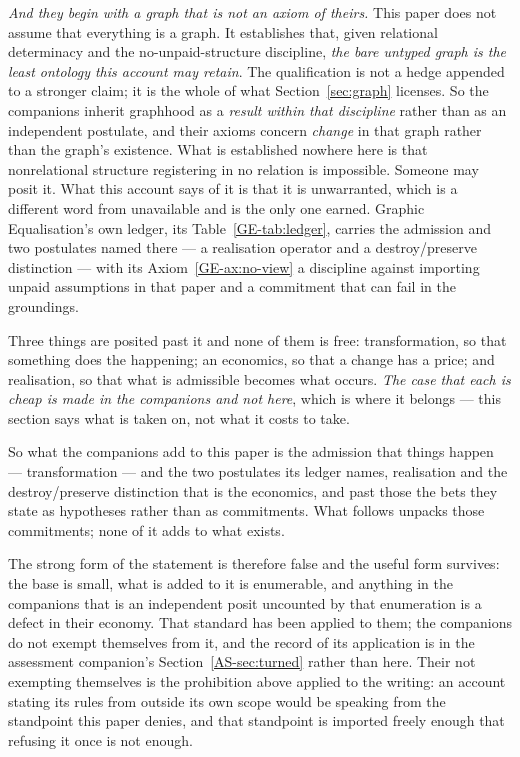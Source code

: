 \documentclass[11pt,a4paper]{article}
\begin{document}
\emph{And they begin with a graph that is not an axiom of theirs.} This paper does not assume that
everything is a graph. It establishes that, given relational determinacy and the
no-unpaid-structure discipline, \emph{the bare untyped graph is the least ontology this account may
retain}. The qualification is not a hedge appended to a stronger claim; it is the whole of what
Section~\ref{sec:graph} licenses. So the companions inherit graphhood as a \emph{result within that
discipline} rather than as an independent postulate, and their axioms concern \emph{change} in that
graph rather than the graph's existence. What is established nowhere here is that nonrelational
structure registering in no relation is impossible. Someone may posit it. What this account says of it
is that it is unwarranted, which is a different word from unavailable and is the only one earned.
Graphic Equalisation's own ledger, its Table~\ref{GE-tab:ledger}, carries the admission and two
postulates named there --- a realisation operator and a destroy\slash preserve distinction --- with its
Axiom~\ref{GE-ax:no-view} a discipline against
importing unpaid assumptions in that paper and a commitment that can fail in the groundings.

Three things are posited past it and none of them is free: transformation, so that something does the
happening; an economics, so that a change has a price; and realisation, so that what is admissible
becomes what occurs. \emph{The case that each is cheap is made in the companions and not here}, which
is where it belongs --- this section says what is taken on, not what it costs to take.

So what the companions add to this paper is the admission that things happen --- transformation ---
and the two postulates its ledger names, realisation and the destroy\slash preserve distinction that is
the economics, and past those the bets they state as hypotheses rather than as commitments. What
follows unpacks those commitments; none of it adds to what exists.

The strong form of the statement is therefore false and the useful form survives: the base is small,
what is added to it is enumerable, and anything in the companions that is an independent posit
uncounted by that enumeration is a defect in their economy. That standard has been applied to them; the companions do not exempt themselves from it, and the
record of its application is in the assessment companion's Section~\ref{AS-sec:turned} rather than
here. Their not exempting themselves is the
prohibition above applied to the writing: an account stating its rules from outside its own scope would
be speaking from the standpoint this paper denies, and that standpoint is imported freely enough that
refusing it once is not enough.
\end{document}
